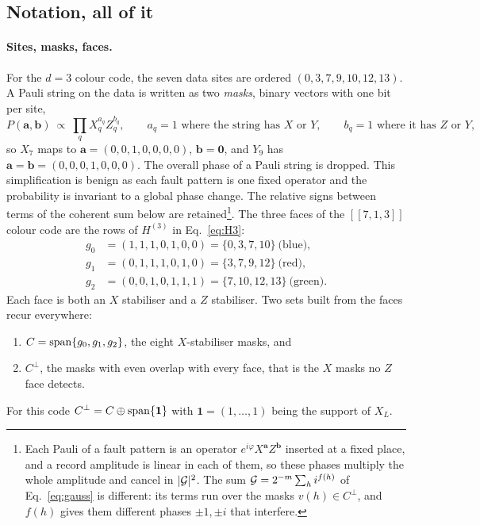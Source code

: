 \subsection{Notation, all of it}\label{app:B-notation}

\paragraph{Sites, masks, faces.} For the $d=3$ colour code, the seven data sites are ordered $(0,3,7,9,10,12,13)$. A Pauli string on the data is written as two \emph{masks}, binary vectors with one bit per site,
\[
P(\boldsymbol a,\boldsymbol b)\ \propto\ \prod_q X_q^{a_q}Z_q^{b_q},\qquad
a_q=1 \text{ where the string has } X \text{ or } Y,\qquad b_q=1 \text{ where it has } Z \text{ or } Y,
\]
so $X_7$ maps to $\boldsymbol a=(0,0,1,0,0,0,0)$, $\boldsymbol b=\boldsymbol0$, and $Y_9$ has $\boldsymbol a=\boldsymbol b=(0,0,0,1,0,0,0)$. 
The overall phase of a Pauli string is dropped. This simplification is benign as each fault pattern is one fixed operator and the probability is invariant to a global phase change. 
The relative signs between terms of the coherent sum below are retained\footnote{Each Pauli of a fault pattern is an operator $e^{i\varphi}X^{\boldsymbol a}Z^{\boldsymbol b}$ inserted at a fixed place, and a record amplitude is linear in each of them, so these phases multiply the whole amplitude and cancel in $|{\cal G}|^2$. The sum ${\cal G}=2^{-m}\sum_h i^{f(h)}$ of Eq.~\eqref{eq:gauss} is different: its terms run over the masks $v(h)\in C^\perp$, and $f(h)$ gives them different phases $\pm1,\pm i$ that interfere.}.
The three faces of the $[[7,1,3]]$ colour code are the rows of $H^{(3)}$ in Eq.~\eqref{eq:H3}:
\[
\begin{aligned}
g_0&=(1,1,1,0,1,0,0)=\{0,3,7,10\}\ \text{(blue)},\\
g_1&=(0,1,1,1,0,1,0)=\{3,7,9,12\}\ \text{(red)},\\
g_2&=(0,0,1,0,1,1,1)=\{7,10,12,13\}\ \text{(green)} .
\end{aligned}
\]
Each face is both an $X$ stabiliser and a $Z$ stabiliser. 
Two sets built from the faces recur everywhere: 
\begin{enumerate}
  \item $C=\operatorname{span}\{g_0,g_1,g_2\}$, the eight $X$-stabiliser masks, and 
  \item $C^\perp$, the masks with even overlap with every face, that is the $X$ masks no $Z$ face detects. 
\end{enumerate}
For this code $C^\perp=C\oplus\operatorname{span}\{\boldsymbol1\}$ with $\boldsymbol1=(1,\ldots,1)$ being the support of $X_L$. 
